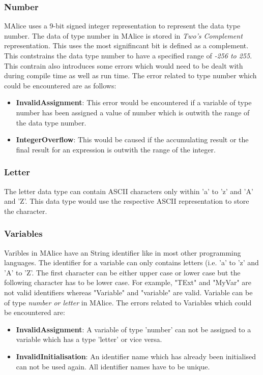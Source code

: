 \documentclass[a4wide, 11pt]{article}
\begin{document}
		\subsubsection{Number}
			\label{sec:num}
			MAlice uses a 9-bit signed integer representation to represent the data type number. The data of type
			number in MAlice is stored in \emph{Two's Complement} representation. This uses the most signifincant
			bit is defined as a complement. 
			This contstrains the data type number to have a specified range of \emph{-256 to 255}. This
			contrain also introduces some errors which would need to be dealt with during compile time as
			well as run time. The error related to type number which could be encountered are as follows:
			\begin{itemize}
				\item {\bf InvalidAssignment}: This error would be encountered if a 
							variable of type number has been assigned a value of number which is 
							outwith the range of the data type number. 
				\item {\bf IntegerOverflow}: This would be caused if the accumulating result or the final result
							for an expression is outwith the range of the integer. 
			\end{itemize}
	
	\subsubsection{Letter}
		\label{sec:letter}
			The letter data type can contain ASCII characters only within 'a' to 'z' and 'A' and 'Z'.
			This data type would use the respective ASCII representation to store the character.

	\subsubsection{Variables}
		\label{sec:var}
			Varibles in MAlice have an String identifier like in most other programming languages.
			The identifier for a variable can only contains letters (i.e. 'a' to 'z' and 'A' to 'Z'.
			The first character can be either upper case or lower case but the following character has to be
			lower case. For example, "TExt" and "MyVar" are not valid identifiers whereas "Variable" and
			"variable" are valid. Variable can be of type 
			\emph{number or letter} in MAlice. The errors related to Variables which could be encountered are:
			\begin{itemize}
				\item {\bf InvalidAssignment}: A variable of type 'number' can not be assigned to a variable which
					has a type 'letter' or vice versa.
				\item {\bf InvalidInitialisation}: An identifier name which has already been initialised can not
					be used again. All identifier names have to be unique.
			\end{itemize}
	
\end{document}
